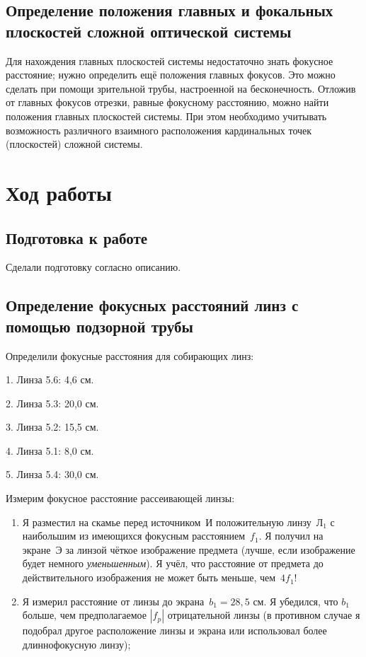 \documentclass[a4paper]{article}
\begin{document}
\subsection{Определение положения главных и фокальных плоскостей сложной
оптической системы}

Для нахождения главных плоскостей системы недостаточно знать фокусное расстояние; нужно определить ещё положения главных фокусов. Это можно сделать при помощи зрительной трубы, настроенной на бесконечность. Отложив от главных фокусов отрезки, равные фокусному расстоянию, можно найти положения главных плоскостей системы. При этом необходимо учитывать возможность различного взаимного расположения кардинальных точек (плоскостей) сложной системы.

\section{Ход работы}

\subsection{Подготовка к работе}

Сделали подготовку согласно описанию.

\subsection{Определение фокусных расстояний линз с помощью подзорной трубы}

Определили фокусные расстояния для собирающих линз:\par

1. Линза 5.6: 4,6 см.\par
2. Линза 5.3: 20,0 см.\par
3. Линза 5.2: 15,5 см.\par
4. Линза 5.1: 8,0 см.\par
5. Линза 5.4: 30,0 см.\par

Измерим фокусное расстояние рассеивающей линзы:\par

\begin{enumerate}
    \item[\textbf{а)}] Я разместил на скамье перед источником~И положительную линзу~Л$_1$ с наибольшим из имеющихся фокусным расстоянием~$f_1$. Я получил на экране~Э за линзой чёткое изображение предмета (лучше, если изображение будет немного \textit{уменьшенным}). Я учёл, что расстояние от предмета до действительного изображения не может быть меньше, чем~$4f_1$!
    
    \item[\textbf{б)}] Я измерил расстояние от линзы до экрана~$b_1 = 28,5$ см. Я убедился, что $b_1$ больше, чем предполагаемое $|f_p|$ отрицательной линзы (в противном случае я подобрал другое расположение линзы и экрана или использовал более длиннофокусную линзу);
\end{enumerate}
\end{document}
